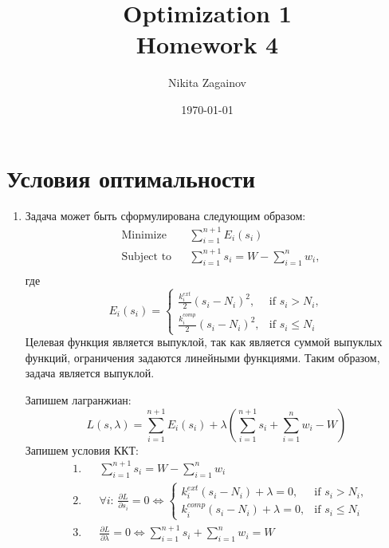 \documentclass{article}
\title{Optimization 1 \\ Homework 4}
\author{Nikita Zagainov}
\date{\selectlanguage{english}\today}
\begin{document}
\maketitle
\section{Условия оптимальности}
\begin{enumerate}
	\item Задача может быть сформулирована следующим образом:
	      \begin{equation*}
		      \begin{aligned}
			       & \text{Minimize}   &  & \sum_{i=1}^{n+1} E_i (s_i)                   \\
			       & \text{Subject to} &  & \sum_{i=1}^{n+1} s_i = W - \sum_{i=1}^n w_i, \\
		      \end{aligned}
	      \end{equation*}
	      где
	      \[
		      E_i (s_i) = \begin{cases}
			      \frac{k_i^{ext}}{2} {(s_i - N_i)}^2,  & \text{if } s_i > N_i,   \\
			      \frac{k_i^{comp}}{2} {(s_i - N_i)}^2, & \text{if } s_i \leq N_i
		      \end{cases}
	      \]
	      Целевая функция является выпуклой, так как является суммой выпуклых функций,
	      ограничения задаются линейными функциями. Таким образом, задача является выпуклой.

	      Запишем лагранжиан:
	      \[
		      L(s, \lambda) = \sum_{i=1}^{n+1} E_i (s_i) + \lambda \left( \sum_{i=1}^{n+1} s_i + \sum_{i=1}^n w_i - W \right)
	      \]
	      Запишем условия ККТ:
	      \begin{equation*}
		      \begin{aligned}
			       & \text{1.} &  & \sum_{i=1}^{n+1} s_i = W - \sum_{i=1}^n w_i                                                                  \\
			       & \text{2.} &  & \forall{i} \text{: } \frac{\partial L}{\partial s_i} = 0 \Longleftrightarrow
			      \begin{cases}
				      k_i^{ext} (s_i - N_i) + \lambda = 0, & \text{if } s_i > N_i, \\ k_i^{comp} (s_i - N_i) + \lambda = 0, & \text{if } s_i \leq N_i
			      \end{cases} \\
			       & \text{3.} &  & \frac{\partial L}{\partial \lambda} = 0 \Longleftrightarrow \sum_{i=1}^{n+1} s_i + \sum_{i=1}^n w_i =
			      W                                                                                                                              \\
		      \end{aligned}
	      \end{equation*}


\end{enumerate}
\end{document}
